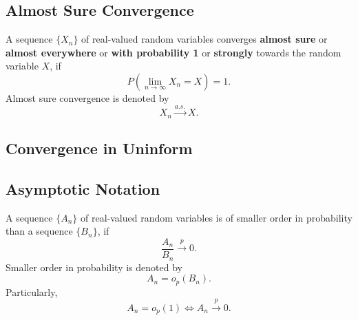 \subsection{Almost Sure Convergence}

\begin{definition}
	A sequence $\{X_n\}$ of real-valued random variables converges \textbf{almost sure} or \textbf{almost everywhere} or \textbf{with probability 1} or \textbf{strongly} towards the random variable $X$, if
	\begin{equation}
		P\left(\lim_{n\to\infty}X_n=X\right)=1.
	\end{equation}
	Almost sure convergence is denoted by
	\begin{equation}
		X_n \stackrel{a.s.}{\rightarrow} X.
	\end{equation}
\end{definition}

\begin{remark}

\end{remark}

\subsection{Convergence in Uninform}

\begin{definition}

\end{definition}

\subsection{Asymptotic Notation}

\begin{definition}
	A sequence $\{A_n\}$ of real-valued random variables is of smaller order in probability than a sequence $\{B_n\}$, if
	\begin{equation}
		\frac{A_n}{B_n}\stackrel{p}{\rightarrow}0.
	\end{equation}
	Smaller order in probability is denoted by
	\begin{equation}
		A_n=o_p(B_n).
	\end{equation}
	Particularly,
	\begin{equation}
		A_n=o_p(1)\iff A_n\stackrel{p}{\rightarrow}0.
	\end{equation}
\end{definition}

